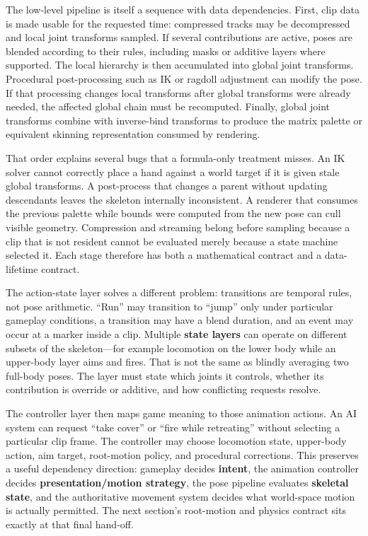The low-level pipeline is itself a sequence with data dependencies. First, clip data is made usable for the requested time: compressed tracks may be decompressed and local joint transforms sampled. If several contributions are active, poses are blended according to their rules, including masks or additive layers where supported. The local hierarchy is then accumulated into global joint transforms. Procedural post-processing such as IK or ragdoll adjustment can modify the pose. If that processing changes local transforms after global transforms were already needed, the affected global chain must be recomputed. Finally, global joint transforms combine with inverse-bind transforms to produce the matrix palette or equivalent skinning representation consumed by rendering.

That order explains several bugs that a formula-only treatment misses. An IK solver cannot correctly place a hand against a world target if it is given stale global transforms. A post-process that changes a parent without updating descendants leaves the skeleton internally inconsistent. A renderer that consumes the previous palette while bounds were computed from the new pose can cull visible geometry. Compression and streaming belong before sampling because a clip that is not resident cannot be evaluated merely because a state machine selected it. Each stage therefore has both a mathematical contract and a data-lifetime contract.

The action-state layer solves a different problem: transitions are temporal rules, not pose arithmetic. ``Run'' may transition to ``jump'' only under particular gameplay conditions, a transition may have a blend duration, and an event may occur at a marker inside a clip. Multiple \textbf{state layers} can operate on different subsets of the skeleton---for example locomotion on the lower body while an upper-body layer aims and fires. That is not the same as blindly averaging two full-body poses. The layer must state which joints it controls, whether its contribution is override or additive, and how conflicting requests resolve.

The controller layer then maps game meaning to those animation actions. An AI system can request ``take cover'' or ``fire while retreating'' without selecting a particular clip frame. The controller may choose locomotion state, upper-body action, aim target, root-motion policy, and procedural corrections. This preserves a useful dependency direction: gameplay decides \textbf{intent}, the animation controller decides \textbf{presentation/motion strategy}, the pose pipeline evaluates \textbf{skeletal state}, and the authoritative movement system decides what world-space motion is actually permitted. The next section's root-motion and physics contract sits exactly at that final hand-off.

